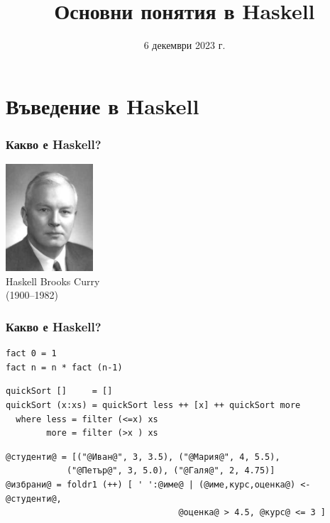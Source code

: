 \documentclass[alsotrans]{beamerswitch}
\title{Основни понятия в Haskell}
\date{6 декември 2023 г.}
\begin{document}
\begin{frame}
  \titlepage
\end{frame}

\section{Въведение в Haskell}

\begin{frame}
  \frametitle{Какво е Haskell?}

  \pause
  \begin{center}
    \includegraphics[height=4cm]{images/HaskellBCurry.jpg}\\
    Haskell Brooks Curry\\
    (1900--1982)\\[5ex]
  \end{center}
\end{frame}

\lstset{basicstyle=\small\ttfamily}

\begin{frame}[fragile]
  \frametitle{Какво е Haskell?}

  \pause
\begin{lstlisting}
fact 0 = 1
fact n = n * fact (n-1)
\end{lstlisting}
  \pause
\begin{lstlisting}
quickSort []     = []
quickSort (x:xs) = quickSort less ++ [x] ++ quickSort more
  where less = filter (<=x) xs
        more = filter (>x ) xs
\end{lstlisting}
  \pause
\begin{lstlisting}
@студенти@ = [("@Иван@", 3, 3.5), ("@Мария@", 4, 5.5),
            ("@Петър@", 3, 5.0), ("@Галя@", 2, 4.75)]
@избрани@ = foldr1 (++) [ ' ':@име@ | (@име,курс,оценка@) <- @студенти@,
                                  @оценка@ > 4.5, @курс@ <= 3 ]
\end{lstlisting}
\end{frame}
\end{document}
